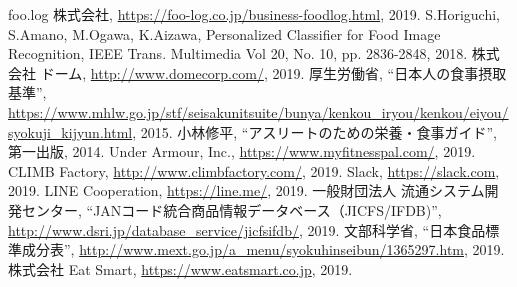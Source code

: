 \begin{thebibliography}{99}
	 foo.log 株式会社, \url{https://foo-log.co.jp/business-foodlog.html}, 2019.
	 S.Horiguchi, S.Amano, M.Ogawa, K.Aizawa, Personalized Classifier for Food Image Recognition, IEEE Trans. Multimedia Vol 20, No. 10, pp. 2836-2848, 2018.
	 株式会社 ドーム, \url{http://www.domecorp.com/}, 2019.
	 厚生労働省, ``日本人の食事摂取基準'', \url{https://www.mhlw.go.jp/stf/seisakunitsuite/bunya/kenkou_iryou/kenkou/eiyou/syokuji_kijyun.html}, 2015.
	 小林修平, ``アスリートのための栄養・食事ガイド'', 第一出版, 2014.
	 Under Armour, Inc., \url{https://www.myfitnesspal.com/}, 2019.
	 CLIMB Factory, \url{http://www.climbfactory.com/}, 2019.
	 Slack, \url{https://slack.com}, 2019.
	 LINE Cooperation, \url{https://line.me/}, 2019.
	 一般財団法人 流通システム開発センター, ``JANコード統合商品情報データベース（JICFS/IFDB)'', \url{http://www.dsri.jp/database_service/jicfsifdb/}, 2019.
	 文部科学省, ``日本食品標準成分表'', \url{http://www.mext.go.jp/a_menu/syokuhinseibun/1365297.htm}, 2019.
	 株式会社 Eat Smart, \url{https://www.eatsmart.co.jp}, 2019.
\end{thebibliography}
